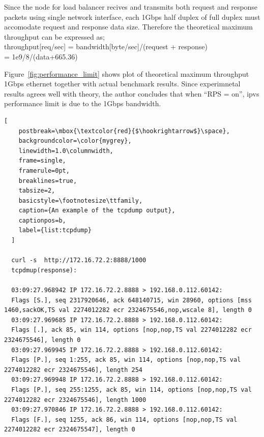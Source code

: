 Since the node for load balancer recives and transmits both request and response packets using single network interface, each 1Gbps half duplex of full duplex must accomodate request and response data size.
Therefore the theoretical maximum throughput can be expressed as; \\
throughput[req/sec] = bandwidth[byte/sec]/(request + response) \\
= 1e9/8/(data+665.36)

Figure~\ref{fig:performance_limit} shows plot of theoretical maximum throughput 1Gbps ethernet together with actual benchmark results.
Since experimnetal results agrees well with theory, the author concludes that when \enquote{RPS = on}, ipvs performance limit is due to the 1Gbps bandwidth.

\begin{lstlisting}[
    postbreak=\mbox{\textcolor{red}{$\hookrightarrow$}\space},
    backgroundcolor=\color{mygrey},
    linewidth=1.0\columnwidth,
    frame=single,
    framerule=0pt,
    breaklines=true,
    tabsize=2,
    basicstyle=\footnotesize\ttfamily,
    caption={An example of the tcpdump output},
    captionpos=b,
    label={list:tcpdump}
  ]

  curl -s  http://172.16.72.2:8888/1000
  tcpdmup(response):

  03:09:27.968942 IP 172.16.72.2.8888 > 192.168.0.112.60142:
  Flags [S.], seq 2317920646, ack 648140715, win 28960, options [mss 1460,sackOK,TS val 2274012282 ecr 2324675546,nop,wscale 8], length 0
  03:09:27.969685 IP 172.16.72.2.8888 > 192.168.0.112.60142:
  Flags [.], ack 85, win 114, options [nop,nop,TS val 2274012282 ecr 2324675546], length 0
  03:09:27.969945 IP 172.16.72.2.8888 > 192.168.0.112.60142:
  Flags [P.], seq 1:255, ack 85, win 114, options [nop,nop,TS val 2274012282 ecr 2324675546], length 254
  03:09:27.969948 IP 172.16.72.2.8888 > 192.168.0.112.60142:
  Flags [P.], seq 255:1255, ack 85, win 114, options [nop,nop,TS val 2274012282 ecr 2324675546], length 1000
  03:09:27.970846 IP 172.16.72.2.8888 > 192.168.0.112.60142:
  Flags [F.], seq 1255, ack 86, win 114, options [nop,nop,TS val 2274012282 ecr 2324675547], length 0
\end{lstlisting}

